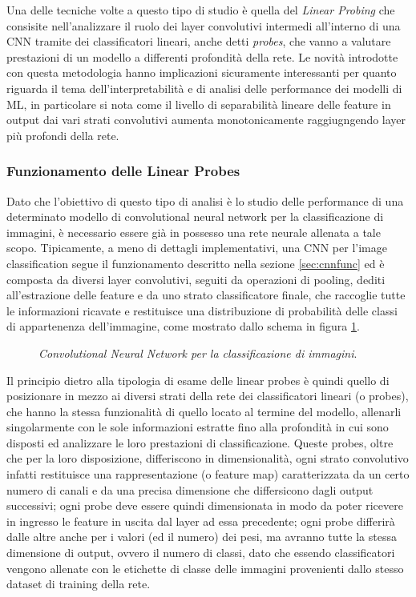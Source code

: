 Una delle tecniche volte a questo tipo di studio è quella del \textit{Linear Probing} \cite{linearprobes} che consisite nell'analizzare il ruolo dei layer convolutivi intermedi all'interno di una CNN tramite dei classificatori lineari, anche detti \textit{probes}, che vanno a valutare prestazioni di un modello a differenti profondità della rete. Le novità introdotte con questa metodologia hanno implicazioni sicuramente interessanti per quanto riguarda il tema dell'interpretabilità e di analisi delle performance dei modelli di ML, in particolare si nota come il livello di separabilità lineare delle feature in output dai vari strati convolutivi aumenta monotonicamente raggiugngendo layer più profondi della rete.

\subsubsection{Funzionamento delle Linear Probes}

Dato che l'obiettivo di questo tipo di analisi è lo studio delle performance di una determinato modello di convolutional neural network per la classificazione di immagini, è necessario essere già in possesso una rete neurale allenata a tale scopo. Tipicamente, a meno di dettagli implementativi, una CNN per l'image classification segue il funzionamento descritto nella sezione \ref{sec:cnnfunc} ed è composta da diversi layer convolutivi, seguiti da operazioni di pooling, dediti all'estrazione delle feature e da uno strato classificatore finale, che raccoglie tutte le informazioni ricavate e restituisce una distribuzione di probabilità delle classi di appartenenza dell'immagine, come mostrato dallo schema in figura \ref{fig:cnn}. 

\begin{figure}[ht!]
    \centering
    \caption{\textit{Convolutional Neural Network per la classificazione di immagini}.}
    \label{fig:cnn}
\end{figure}

Il principio dietro alla tipologia di esame delle linear probes è quindi quello di posizionare in mezzo ai diversi strati della rete dei classificatori lineari (o probes), che hanno la stessa funzionalità di quello locato al termine del modello, allenarli singolarmente con le sole informazioni estratte fino alla profondità in cui sono disposti ed analizzare le loro prestazioni di classificazione. Queste probes, oltre che per la loro disposizione, differiscono in dimensionalità, ogni strato convolutivo infatti restituisce una rappresentazione (o feature map) caratterizzata da un certo numero di canali e da una precisa dimensione che differsicono dagli output successivi; ogni probe deve essere quindi dimensionata in modo da poter ricevere in ingresso le feature in uscita dal layer ad essa precedente; ogni probe differirà dalle altre anche per i valori (ed il numero) dei pesi, ma avranno tutte la stessa dimensione di output, ovvero il numero di classi, dato che essendo classificatori vengono allenate con le etichette di classe delle immagini provenienti dallo stesso dataset di training della rete.

